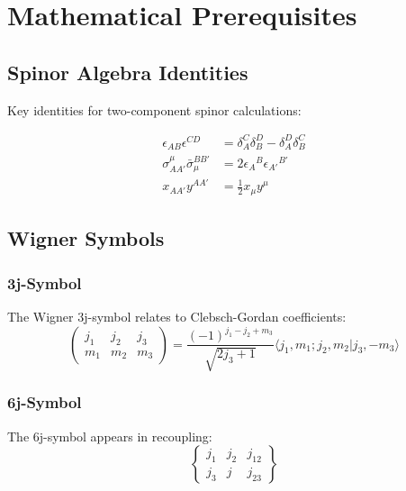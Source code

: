 \documentclass[11pt,a4paper,twoside]{book}
\theoremstyle{definition}
\begin{document}
\chapter{Mathematical Prerequisites}
\label{app:prerequisites}

\section{Spinor Algebra Identities}

Key identities for two-component spinor calculations:

\begin{align}
    \epsilon_{AB} \epsilon^{CD} &= \delta_A^C \delta_B^D - \delta_A^D \delta_B^C \\
    \sigma^{\mu}_{AA'} \bar{\sigma}_{\mu}^{BB'} &= 2\epsilon_A{}^B \epsilon_{A'}{}^{B'} \\
    x_{AA'} y^{AA'} &= \frac{1}{2} x_{\mu} y^{\mu}
\end{align}

\section{Wigner Symbols}

\subsection{3j-Symbol}

The Wigner 3j-symbol relates to Clebsch-Gordan coefficients:
\begin{equation}
    \begin{pmatrix}
        j_1 & j_2 & j_3 \\
        m_1 & m_2 & m_3
    \end{pmatrix}
    = \frac{(-1)^{j_1-j_2+m_3}}{\sqrt{2j_3+1}} 
    \langle j_1, m_1; j_2, m_2 | j_3, -m_3 \rangle
\end{equation}

\subsection{6j-Symbol}

The 6j-symbol appears in recoupling:
\begin{equation}
    \begin{Bmatrix}
        j_1 & j_2 & j_{12} \\
        j_3 & j & j_{23}
    \end{Bmatrix}
\end{equation}
\end{document}
